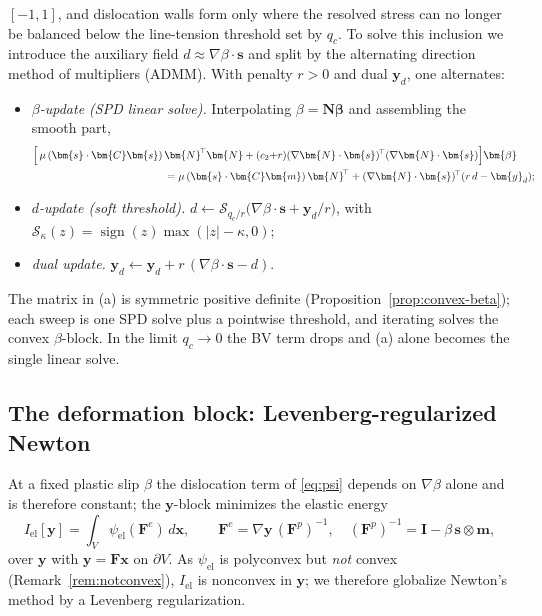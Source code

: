 \documentclass[12pt]{article}
\theoremstyle{plain}
\theoremstyle{definition}
\newcommand{\bF}{\bm{F}}
\newcommand{\bC}{\bm{C}}
\newcommand{\bs}{\bm{s}}
\newcommand{\bmm}{\bm{m}}
\newcommand{\by}{\bm{y}}
\newcommand{\bx}{\bm{x}}
\newcommand{\bI}{\bm{I}}
\newcommand{\bN}{\bm{N}}
\newcommand{\bbeta}{\bm{\beta}}
\newcommand{\Fe}{\bF^{e}}
\newcommand{\Fp}{\bF^{p}}
\begin{document}
$[-1,1]$, and dislocation walls form only where the resolved stress can no
longer be balanced below the line-tension threshold set by $q_c$.
To solve this inclusion we introduce the auxiliary field
$d\approx\nabla\beta\cdot\bs$ and split by the alternating direction method of
multipliers (ADMM). With penalty $r>0$ and dual $\bm{y}_d$, one alternates:
\begin{itemize}\setlength{\itemsep}{3pt}\setlength{\topsep}{3pt}
  \item[(a)] \emph{$\beta$-update (SPD linear solve).} Interpolating
  $\beta=\bN\bbeta$ and assembling the smooth part,
  \begin{equation}\label{eq:blockbeta}
  \begin{split}
    \Bigl[\,\mu\,(\bs\cdot\bC\bs)\,&\bN^{\!\top}\bN
    +(c_2{+}r)(\nabla\bN\cdot\bs)^{\!\top}(\nabla\bN\cdot\bs)\Bigr]\bbeta\\
    &=\mu\,(\bs\cdot\bC\bmm)\,\bN^{\!\top}
    +(\nabla\bN\cdot\bs)^{\!\top}(r\,d-\bm{y}_d);
  \end{split}
  \end{equation}
  \item[(b)] \emph{$d$-update (soft threshold).}
  $d\leftarrow\mathcal{S}_{q_c/r}\bigl(\nabla\beta\cdot\bs+\bm{y}_d/r\bigr)$,
  with $\mathcal{S}_\kappa(z)=\operatorname{sign}(z)\max(|z|-\kappa,0)$;
  \item[(c)] \emph{dual update.}
  $\bm{y}_d\leftarrow\bm{y}_d+r\,(\nabla\beta\cdot\bs-d)$.
\end{itemize}
The matrix in (a) is symmetric positive definite
(Proposition~\ref{prop:convex-beta}); each sweep is one SPD solve plus a
pointwise threshold, and iterating solves the convex $\beta$-block. In the limit
$q_c\to0$ the BV term drops and (a) alone becomes the single linear solve.

\subsection{The deformation block: Levenberg-regularized Newton}\label{sec:blocky}
At a fixed plastic slip $\beta$ the dislocation term of \eqref{eq:psi} depends on
$\nabla\beta$ alone and is therefore constant; the $\by$-block minimizes the
elastic energy
\begin{equation}\label{eq:Iel}
  I_{\mathrm{el}}[\by]=\int_{V}\psi_{\mathrm{el}}(\Fe)\,d\bx,\qquad
  \Fe=\nabla\by\,(\Fp)^{-1},\quad (\Fp)^{-1}=\bI-\beta\,\bs\otimes\bmm,
\end{equation}
over $\by$ with $\by=\bF\bx$ on $\partial V$. As $\psi_{\mathrm{el}}$ is
polyconvex but \emph{not} convex (Remark~\ref{rem:notconvex}), $I_{\mathrm{el}}$
is nonconvex in $\by$; we therefore globalize Newton's method by a Levenberg
regularization.
\end{document}
